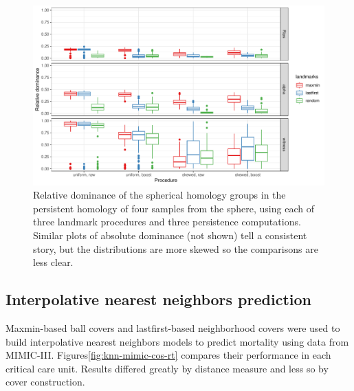\documentclass{article}
\begin{document}
\begin{figure}
\includegraphics[width=\textwidth]{homology-sphere-relative}
\caption{
Relative dominance of the spherical homology groups in the persistent homology of four samples from the sphere, using each of three landmark procedures and three persistence computations. Similar plots of absolute dominance (not shown) tell a consistent story, but the distributions are more skewed so the comparisons are less clear.
\label{fig:sphere}
}
\end{figure}

\hypertarget{interpolative-nearest-neighbors-prediction-2}{%
\subsection{Interpolative nearest neighbors
prediction}\label{interpolative-nearest-neighbors-prediction-2}}

Maxmin-based ball covers and lastfirst-based neighborhood covers were
used to build interpolative nearest neighbors models to predict
mortality using data from MIMIC-III.
Figures\nbs\ref{fig:knn-mimic-cos-rt} compares their performance in each
critical care unit. Results differed greatly by distance measure and
less so by cover construction.
\end{document}
